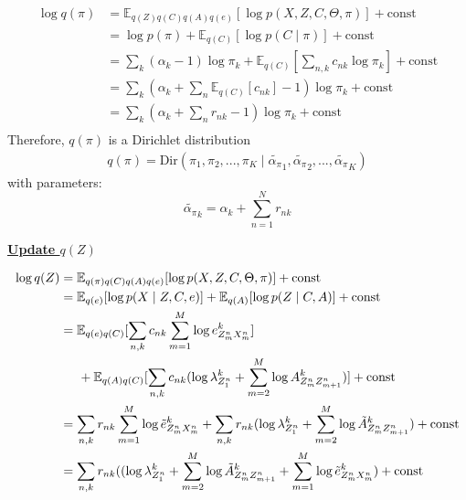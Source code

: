 \documentclass[12pt]{article}
\newenvironment{problem}[2][Problem]{\begin{trivlist}
\item[\hskip \labelsep {\bfseries #1}\hskip \labelsep {\bfseries #2.}]}{\end{trivlist}}
\begin{document}
\begin{problem}{2.8.24}
\begin{align*}
    \log q(\pi) &= \mathbb{E}_{q(Z)q(C)q(A)q(e)}[\log p(X, Z, C, \Theta, \pi)] + \text{const} \\
    &= \log p(\pi) + \mathbb{E}_{q(C)}[\log p(C \mid \pi)] + \text{const} \\
    &= \sum_{k}(\alpha_k - 1)\log \pi_k + \mathbb{E}_{q(C)}[\sum_{n,k}c_{nk}\log\pi_k] + \text{const} \\
    &= \sum_{k}(\alpha_k + \sum_{n}\mathbb{E}_{q(C)}[c_{nk}] - 1)\log \pi_k + \text{const} \\
    &= \sum_{k}(\alpha_k + \sum_{n}r_{nk} - 1)\log \pi_k + \text{const} \\
\end{align*}
Therefore, $q(\pi)$ is a Dirichlet distribution 
\begin{align*}
    q(\pi) = \mathrm{Dir}(\pi_1, \pi_2, ..., \pi_K \mid 
    \tilde{\alpha_{\pi}}_1,\tilde{\alpha_{\pi}}_2,...,\tilde{\alpha_{\pi}}_K)
\end{align*}
with parameters:
\begin{equation}
    \tilde{\alpha_{\pi}}_k = \alpha_k + \sum_{n=1}^{N}r_{nk}
\end{equation}
\begin{flushleft}
    \textbf{\underline{Update $q(Z)$}}
\end{flushleft}
\begin{align*}
    \log q(Z) &= \mathbb{E}_{q(\pi)q(C)q(A)q(e)}[\log p(X, Z, C, \Theta, \pi)] + \text{const} \\
    &= \mathbb{E}_{q(e)}[\log p(X \mid Z, C, e)] + \mathbb{E}_{q(A)}[\log p(Z \mid C, A)]
       + \text{const} \\
    &= \mathbb{E}_{q(e)q(C)}[\sum_{n,k}c_{nk}\sum_{m=1}^{M}\log e^k_{Z^n_m X^n_m}] \\
    &\hspace{0.5cm}  + \mathbb{E}_{q(A)q(C)}[\sum_{n,k}c_{nk}(\log\lambda^k_{Z^n_{1}} + \sum_{m=2}^{M}\log A^k_{Z^n_{m}Z^n_{m+1}})]
       + \text{const} \\
    &= \sum_{n,k}r_{nk}\sum_{m=1}^{M}\log \tilde{e}^k_{Z^n_m X^n_m}
        + \sum_{n,k}r_{nk}(\log\lambda^k_{Z^n_{1}} + \sum_{m=2}^{M}\log \tilde{A}^k_{Z^n_{m}Z^n_{m+1}})
        + \text{const} \\
    &= \sum_{n,k}r_{nk}(
        (\log\lambda^k_{Z^n_{1}} + \sum_{m=2}^{M}\log \tilde{A}^k_{Z^n_{m}Z^n_{m+1}}
        +\sum_{m=1}^{M} \log \tilde{e}^k_{Z^n_m X^n_m})
        + \text{const} \\
\end{align*}

\end{problem}
\end{document}
